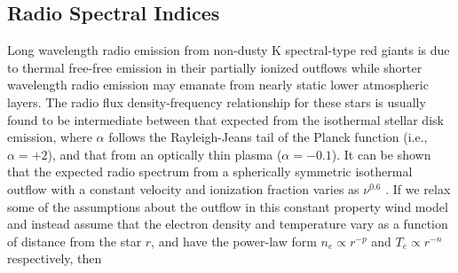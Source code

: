 \documentclass[iop]{emulateapj}
\begin{document}
\subsection{Radio Spectral Indices} \label{disc:disc3}
Long wavelength radio emission from non-dusty K spectral-type red giants is due to thermal free-free emission in their partially ionized outflows while shorter wavelength radio emission may emanate from nearly static lower atmospheric layers. The radio flux density-frequency relationship for these stars is usually found to be intermediate between that expected from the isothermal stellar disk emission, where $\alpha$ follows the Rayleigh-Jeans tail of the Planck function (i.e., $\alpha = +2$), and that from an optically thin plasma ($\alpha = -0.1$). It can be shown that the expected radio spectrum from a spherically symmetric isothermal outflow with a constant velocity and ionization fraction varies as $\nu ^{0.6}$ \citep{1975MNRAS.170...41W,1975AA....39..217O,1975AA....39....1P}. If we relax some of the assumptions about the outflow in this constant property wind model and instead assume that the electron density and temperature vary as a function of distance from the star $r$, and have the power-law form $n_{e} \propto r^{-p}$ and $T_{e} \propto r^{-n}$ respectively, then 
\end{document}
